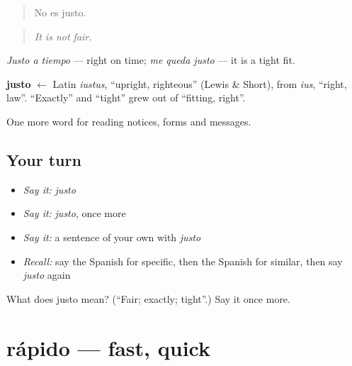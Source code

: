 \begin{quote}
No es justo.
\end{quote}

\begin{quote}
\emph{It is not fair.}
\end{quote}

\emph{Justo a tiempo} — right on time; \emph{me queda justo} — it is a tight fit.

\begin{cousinweb}
\textbf{justo} $\leftarrow$ Latin \emph{iustus}, \textquotedblleft{}upright, righteous\textquotedblright{} (Lewis \& Short), from \emph{ius}, \textquotedblleft{}right, law\textquotedblright{}. \textquotedblleft{}Exactly\textquotedblright{} and \textquotedblleft{}tight\textquotedblright{} grew out of \textquotedblleft{}fitting, right\textquotedblright{}.
\end{cousinweb}

\begin{grammarlens}[title={What you've built}]
One more word for reading notices, forms and messages.
\end{grammarlens}

\subsection*{Your turn}
\begin{itemize}
\raggedright
  \item \emph{Say it:} \emph{justo}
  \item \emph{Say it:} \emph{justo}, once more
  \item \emph{Say it:} a sentence of your own with \emph{justo}
  \item \emph{Recall:} say the Spanish for specific, then the Spanish for similar, then say \emph{justo} again
\end{itemize}

\begin{tcolorbox}[breakable,colback=teal!4,colframe=teal!35!black,title={Before you move on}]
What does justo mean? (\textquotedblleft{}Fair; exactly; tight\textquotedblright{}.) Say it once more.
\end{tcolorbox}
\section[rápido]{rápido — fast, quick}

\label{lesson:ES-C482-rapido}



